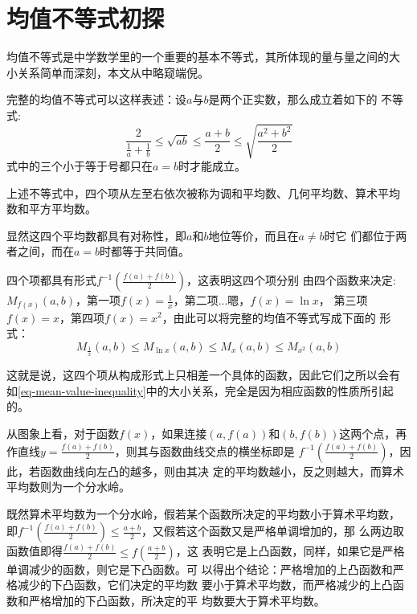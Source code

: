 
\section{均值不等式初探}
\label{sec:mean-value-inequality}

均值不等式是中学数学里的一个重要的基本不等式，其所体现的量与量之间的大
小关系简单而深刻，本文从中略窥端倪。

完整的均值不等式可以这样表述：设$a$与$b$是两个正实数，那么成立着如下的
不等式:
\begin{equation}
  \label{eq-mean-value-inequality}
  \frac{2}{\frac{1}{a}+\frac{1}{b}}\leqslant \sqrt{ab} \leqslant
  \frac{a+b}{2} \leqslant \sqrt{\frac{a^2+b^2}{2}}
\end{equation}
式中的三个小于等于号都只在$a=b$时才能成立。

上述不等式中，四个项从左至右依次被称为调和平均数、几何平均数、算术平均
数和平方平均数。

显然这四个平均数都具有对称性，即$a$和$b$地位等价，而且在$a\neq b$时它
们都位于两者之间，而在$a=b$时都等于共同值。

四个项都具有形式$f^{-1}(\frac{f(a)+f(b)}{2})$，这表明这四个项分别
由四个函数来决定:$M_{f(x)}(a,b)$，第一项$f(x)=\frac{1}{x}$，第二项...嗯，$f(x)=\ln{x}$，
第三项$f(x)=x$，第四项$f(x)=x^2$，由此可以将完整的均值不等式写成下面的
形式：
\begin{equation}
  \label{eq:mean-value-inequality-with-function}
  M_{\frac{1}{x}}(a,b) \leqslant M_{\ln{x}}(a,b) \leqslant M_x(a,b)
  \leqslant M_{x^2}(a,b)
\end{equation}

这就是说，这四个项从构成形式上只相差一个具体的函数，因此它们之所以会有
如\ref{eq-mean-value-inequality}中的大小关系，完全是因为相应函数的性质所引起的。

从图象上看，对于函数$f(x)$，如果连接$(a,f(a))$和$(b,f(b))$这两个点，再
作直线$y=\frac{f(a)+f(b)}{2}$，则其与函数曲线交点的横坐标即是
$f^{-1}(\frac{f(a)+f(b)}{2})$，因此，若函数曲线向左凸的越多，则由其决
定的平均数越小，反之则越大，而算术平均数则为一个分水岭。

既然算术平均数为一个分水岭，假若某个函数所决定的平均数小于算术平均数，
即$f^{-1}(\frac{f(a)+f(b)}{2}) \leqslant \frac{a+b}{2}$，又假若这个函数又是严格单调增加的，那
么两边取函数值即得$\frac{f(a)+f(b)}{2} \leqslant f(\frac{a+b}{2})$，这
表明它是上凸函数，同样，如果它是严格单调减少的函数，则它是下凸函数。可
以得出个结论：严格增加的上凸函数和严格减少的下凸函数，它们决定的平均数
要小于算术平均数，而严格减少的上凸函数和严格增加的下凸函数，所决定的平
均数要大于算术平均数。

